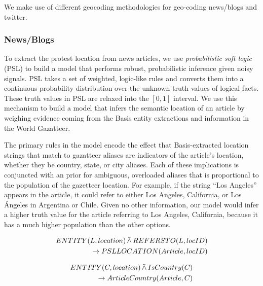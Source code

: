%
%

We make use of different geocoding methodologies for geo-coding news/blogs and twitter.

\subsubsection{News/Blogs}

To extract the protest location from news articles, we use \emph{probabilistic soft logic} (PSL) \cite{broecheler:uai10} to build a model that performs robust, probabilistic inference given noisy signals. PSL takes a set of weighted, logic-like rules and converts them into a continuous probability distribution over the unknown truth values of logical facts. These truth values in PSL are relaxed into the $[0,1]$ interval. We use this mechanism to build a model that infers the semantic location of an article by weighing evidence coming from the Basis entity extractions and information in the World Gazatteer. 

The primary rules in the model encode the effect that Basis-extracted location strings that match to gazatteer aliases are indicators of the article's location, whether they be country, state, or city aliases. Each of these implications is conjuncted with an prior for ambiguous, overloaded aliases that is proportional to the population of the gazetteer location. For example, if the string ``Los Angeles'' appears in the article, it could refer to either Los Angeles, California, or Los \'{A}ngeles in Argentina or Chile. Given no other information, our model would infer a higher truth value for the article referring to Los Angeles, California, because it has a much higher population than the other options. 

\begin{align*}
    \begin{split}
    ENTITY(L, location) \softand REFERSTO(L, locID)\\
    \rightarrow PSLLOCATION(Article, locID)
\end{split}
\end{align*}


\begin{align*}
    \begin{split}
        ENTITY(C, location) \softand IsCountry(C)\\
    \rightarrow ArticleCountry(Article, C)
\end{split}
\end{align*}


